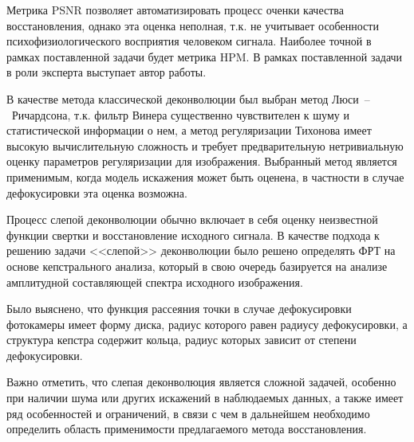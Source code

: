 Метрика PSNR позволяет автоматизировать процесс оченки качества восстановления, однако эта оценка неполная, т.к. не учитывает особенности психофизиологического восприятия человеком сигнала. Наиболее точной в рамках поставленной задачи будет метрика HPM. В рамках поставленной задачи в роли эксперта выступает автор работы.

В качестве метода классической деконволюции был выбран метод Люси~--~Ричардсона, т.к. фильтр Винера существенно чувствителен к шуму и статистической информации о нем, а метод регуляризации Тихонова имеет высокую вычислительную сложность и требует предварительную нетривиальную оценку параметров регуляризации для изображения. Выбранный метод является применимым, когда модель искажения может быть оценена, в частности в случае дефокусировки эта оценка возможна.

Процесс слепой деконволюции обычно включает в себя оценку неизвестной функции свертки и восстановление исходного сигнала. В качестве подхода к решению задачи <<слепой>> деконволюции было решено определять ФРТ на основе кепстрального анализа, который в свою очередь базируется на анализе амплитудной составляющей спектра исходного изображения. 

Было выяснено, что функция рассеяния точки в случае дефокусировки фотокамеры имеет форму диска, радиус которого равен радиусу дефокусировки, а структура кепстра содержит кольца, радиус которых зависит от степени дефокусировки.

Важно отметить, что слепая деконволюция является сложной задачей, особенно при наличии шума или других искажений в наблюдаемых данных, а также имеет ряд особенностей и ограничений, в связи с чем в дальнейшем необходимо определить область применимости предлагаемого метода восстановления.